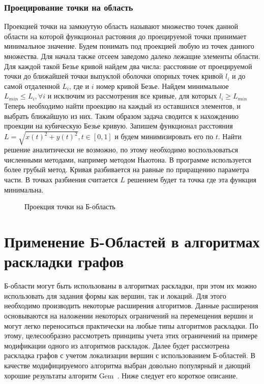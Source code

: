 \documentclass[a4paper,12pt]{report}
\begin{document}
\subsection{Проецирование точки на область}

Проекцией точки на замкнутую область называют множество точек данной области на которой функционал растояния до проецируемой точки принимает минимальное значение. Будем понимать под проекцией любую из точек данного множества. Для начала также отсеем заведомо далеко лежащие элементы области. Для каждой такой Безье кривой найдем два числа: расстояние от проецируемой точки до ближайшей точки выпуклой оболочки опорных точек кривой $l_i$ и до самой отдаленной $L_i$,  где и $i$ номер кривой Безье. Найдем минимальное $L_{min} \leq L_i,  \forall i$ и исключим из рассмотрения все кривые, для которых $l_i \geq L_{min}$ Теперь необходимо найти проекцию на каждый из оставшихся элементов, и выбрать ближайшую из них. Таким образом задача сводится к нахождению проекции на кубическую Безье кривую. Запишем функционал расстояния $L=\sqrt{x(t)^2+y(t)^2}, t\in[0,1]$ и будем минимизировать его по $t$. Найти решение аналитически не возможно, по этому необходимо воспользоваться численными методами, например методом Ньютона. В программе используется более грубый метод. Кривая разбивается на равные по приращению параметра части. В точках разбиения считается $L$ решением будет та точка где эта функция минимальна.

\begin{figure}
\caption{Проекция точки на Б-область}
\label{ris:NQsph}
\end{figure}

\chapter{Применение Б-Областей в алгоритмах раскладки графов} 

Б-области могут быть использованы в алгоритмах раскладки, при этом их можно использовать для задания формы как вершин, так и локаций. Для этого необходимо производить некоторые расширения алгоритмов. Данные расширения основываются на наложении некоторых ограничений на перемещения вершин и могут легко переноситься практически на любые типы алгоритмов раскладки. По этому, целесообразно рассмотреть принципы учета этих ограничений на примере модификации одного из алгоритмов раскладок. Далее будет рассмотрена раскладка графов с учетом локализации вершин с использованием Б-областей. В качестве модифицируемого алгоритма выбран довольно популярный и дающий хорошие результаты алгоритм Gem~\cite{bilevich}. Ниже следует его короткое описание.
\end{document}

